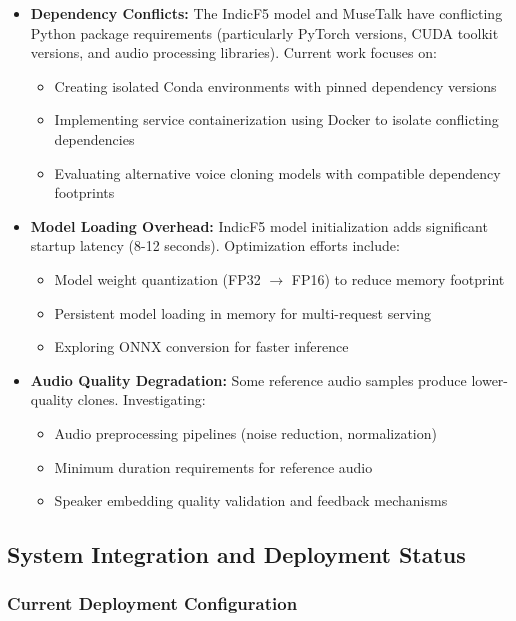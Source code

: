\documentclass[12pt,oneside]{report}
\begin{document}
\begin{itemize}
    \item \textbf{Dependency Conflicts:} The IndicF5 model and MuseTalk have conflicting Python package requirements (particularly PyTorch versions, CUDA toolkit versions, and audio processing libraries). Current work focuses on:
    \begin{itemize}
        \item Creating isolated Conda environments with pinned dependency versions
        \item Implementing service containerization using Docker to isolate conflicting dependencies
        \item Evaluating alternative voice cloning models with compatible dependency footprints
    \end{itemize}
    
    \item \textbf{Model Loading Overhead:} IndicF5 model initialization adds significant startup latency (8-12 seconds). Optimization efforts include:
    \begin{itemize}
        \item Model weight quantization (FP32 $\rightarrow$ FP16) to reduce memory footprint
        \item Persistent model loading in memory for multi-request serving
        \item Exploring ONNX conversion for faster inference
    \end{itemize}
    
    \item \textbf{Audio Quality Degradation:} Some reference audio samples produce lower-quality clones. Investigating:
    \begin{itemize}
        \item Audio preprocessing pipelines (noise reduction, normalization)
        \item Minimum duration requirements for reference audio
        \item Speaker embedding quality validation and feedback mechanisms
    \end{itemize}
\end{itemize}

\subsection{System Integration and Deployment Status}

\subsubsection{Current Deployment Configuration}
\end{document}
